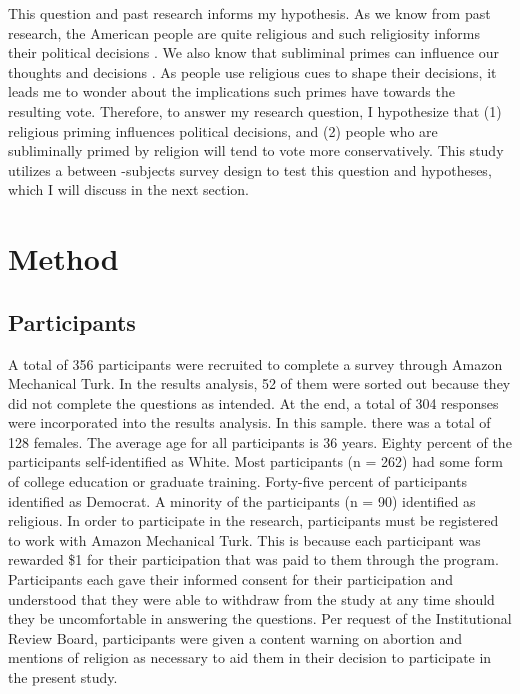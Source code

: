 \documentclass[letterpaper,man,natbib,noextraspace,12pt]{apa6}  %
\begin{document}
This question and past research informs my hypothesis. As we know from past research, the American people are quite religious \citep{putnam_american_2010} and such religiosity informs their political decisions \citep{rutchick_deus_2010}. We also know that subliminal primes can influence our thoughts \citep{kahneman_thinking_2012} and decisions \citep{albertson_religious_2011, kam_implicit_2007}. As people use religious cues to shape their decisions, it leads me to wonder about the implications such primes have towards the resulting vote. Therefore, to answer my research question, I hypothesize that (1) religious priming influences political decisions, and (2) people who are subliminally primed by religion will tend to vote more conservatively. This study utilizes a between -subjects survey design to test this question and hypotheses, which I will discuss in the next section. 

\section{Method}

\subsection{Participants}

A total of 356 participants were recruited to complete a survey through Amazon Mechanical Turk. In the results analysis, 52 of them were sorted out because they did not complete the questions as intended. At the end, a total of 304 responses were incorporated into the results analysis. In this sample. there was a total of 128 females. The average age for all participants is 36 years. Eighty percent of the participants self-identified as White. Most participants (n = 262) had some form of college education or graduate training. Forty-five percent of participants identified as Democrat. A minority of the participants (n = 90) identified as religious. In order to participate in the research, participants must be registered to work with Amazon Mechanical Turk. This is because each participant was rewarded \$1 for their participation that was paid to them through the program. Participants each gave their informed consent for their participation and understood that they were able to withdraw from the study at any time should they be uncomfortable in answering the questions. Per request of the Institutional Review Board, participants were given a content warning on abortion and mentions of religion as necessary to aid them in their decision to participate in the present study.
\end{document}
